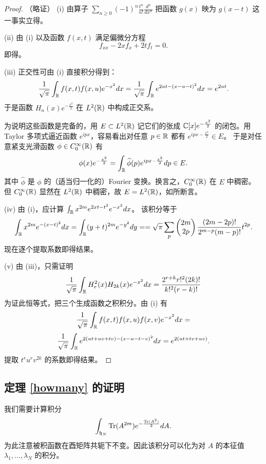 \begin{proof}（略证）
(i) 由算子 $\sum_{n\ge 0} (-1)^n\frac{t^n}{n!}\frac{d^n}{dx^n}$ 
把函数 $g(x)$ 映为 $g(x-t)$ 这一事实立得。

(ii) 由 (i) 以及函数 $f(x,t)$ 满足偏微分方程
$$
f_{xx}-2xf_x+2tf_t=0.
$$ 
即得。

(iii) 正交性可由 (i) 直接积分得到：
$$
\frac{1}{\sqrt{\pi}}\int_{\Bbb R}f(x,t)f(x,u)e^{-x^2}dx=\frac{1}{\sqrt{\pi}}\int_{\Bbb R}e^{2ut-(x-u-t)^2}dx=e^{2ut}.
$$ 
于是函数 $H_n(x)e^{-\frac{x^2}{2}}$ 在 $L^2(\Bbb R)$ 中构成正交系。

为说明这些函数是完备的，用 $E\subset L^2(\Bbb R)$ 记它们的张成 $\Bbb C[x]e^{-\frac{x^2}{2}}$ 的闭包。用 Taylor 多项式逼近函数 $e^{ipx}$，容易看出对任意 $p\in \Bbb R$ 都有 $e^{ipx-\frac{x^2}{2}}\in E$。
于是对任意紧支光滑函数 $\phi\in C_0^\infty(\Bbb R)$ 有
$$
\phi(x)e^{-\frac{x^2}{2}}=\int_{\Bbb R} \widehat \phi(p)e^{ipx-\frac{x^2}{2}}dp\in E.
$$
其中 $\widehat \phi$ 是 $\phi$ 的（适当归一化的）Fourier 变换。换言之，$C_0^\infty(\Bbb R)$ 在 $E$ 中稠密。
但 $C_0^\infty(\Bbb R)$ 显然在 $L^2(\Bbb R)$ 中稠密，故 $E=L^2(\Bbb R)$，如所断言。

(iv) 由 (i)，应计算
$\int_{\Bbb R}x^{2m}e^{2xt-t^2}e^{-x^2}dx$。
该积分等于
$$
\int_{\Bbb R}x^{2m}e^{-(x-t)^2}dx=\int_{\Bbb R}(y+t)^{2m}e^{-y^2}dy=
=\sqrt{\pi}
\sum_p \begin{pmatrix} 2m\\ 2p\end{pmatrix} \frac{(2m-2p)!}{2^{m-p}(m-p)!}t^{2p}.
$$
现在逐个提取系数即得结果。

(v) 由 (iii)，只需证明
$$
\frac{1}{\sqrt{\pi}}\int_{\Bbb R}H_r^2(x)H_{2k}(x)
e^{-x^2}dx=\frac{2^{r+k}r!^2(2k)!}{k!^2(r-k)!}
$$
为证此恒等式，把三个生成函数之积积分。由 (i) 有
$$
\frac{1}{\sqrt{\pi}}\int_{\Bbb R}f(x,t)f(x,u)f(x,v)e^{-x^2}dx=
$$
$$
\frac{1}{\sqrt{\pi}}\int_{\Bbb R}e^{2(ut+uv+tv)-(x-u-t-v)^2}dx
=e^{2(ut+tv+uv)}.
$$
提取 $t^ru^rv^{2k}$ 的系数即得结果。
\end{proof}

\subsection{定理 \ref{howmany} 的证明}
我们需要计算积分
$$
\int_{{\frak h}_N}\Tr(A^{2m})e^{-\frac{\Tr(A^2)}{2}}dA.
$$
为此注意被积函数在酉矩阵共轭下不变。因此该积分可以化为对 $A$ 的本征值 $\lambda_1, \ldots ,\lambda_N$ 的积分。

